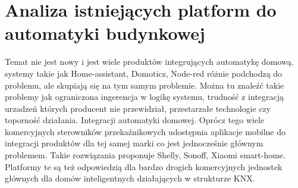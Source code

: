 \chapter{Analiza istniejących platform do automatyki budynkowej}
Temat nie jest nowy i jest wiele produktów integrujących automatykę domową. systemy takie jak Home-assistant, Domoticz, Node-red różnie podchodzą do problemu, ale skupiają się na tym samym problemie. Można tu znaleźć takie problemy jak ograniczona ingerencja w logikę systemu, trudność z integracją urzadzeń których producent nie przewidział, przestarzałe technologie czy toporność działania. Integracji automatyki domowej. Oprócz tego wiele komercyjnych sterowników przekaźnikowych udostępnia aplikacje mobilne do integracji produktów dla tej samej marki co jest jednocześnie głównym problemem. Takie rozwiązania proponuje Shelly, Sonoff, Xiaomi smart-home. Platformy te są też odpowiedzią dla bardzo drogich komercyjnych jednostek głównych dla domów inteligentnych działających w strukturze KNX. 